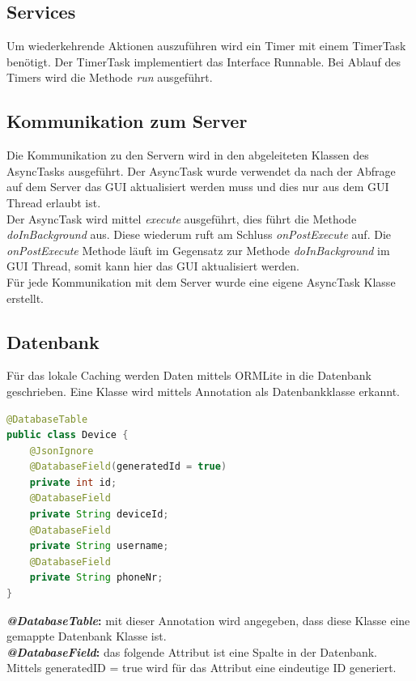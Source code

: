 \subsection{Services}
Um wiederkehrende Aktionen auszuführen wird ein Timer mit einem TimerTask benötigt. Der TimerTask implementiert das Interface Runnable. Bei Ablauf des Timers wird die Methode \textit{run} ausgeführt. 

\subsection{Kommunikation zum Server}
Die Kommunikation zu den Servern wird in den abgeleiteten Klassen des AsyncTasks ausgeführt. Der AsyncTask wurde verwendet da nach der Abfrage auf dem Server das GUI aktualisiert werden muss und dies nur aus dem GUI Thread erlaubt ist. \\
Der AsyncTask wird mittel \textit{execute} ausgeführt, dies führt die Methode \textit{doInBackground} aus. Diese wiederum ruft am Schluss \textit{onPostExecute} auf. Die \textit{onPostExecute} Methode läuft im Gegensatz zur Methode \textit{doInBackground} im GUI Thread, somit kann hier das GUI aktualisiert werden.
\\Für jede Kommunikation mit dem Server wurde eine eigene AsyncTask Klasse erstellt.

\subsection{Datenbank}
Für das lokale Caching werden Daten mittels ORMLite in die Datenbank geschrieben. Eine Klasse wird mittels Annotation als Datenbankklasse erkannt.

\begin{lstlisting}[language=Java, caption=ORMLite Annotations]
@DatabaseTable
public class Device {
	@JsonIgnore
	@DatabaseField(generatedId = true)
	private int id;
	@DatabaseField
	private String deviceId;
	@DatabaseField
	private String username;
	@DatabaseField
	private String phoneNr;
}
\end{lstlisting}

\textbf{\textit{@DatabaseTable}:} mit dieser Annotation wird angegeben, dass diese Klasse eine gemappte Datenbank Klasse ist.\\
\textbf{\textit{@DatabaseField}:} das folgende Attribut ist eine Spalte in der Datenbank. Mittels generatedID = true wird für das Attribut eine eindeutige ID generiert.\\

